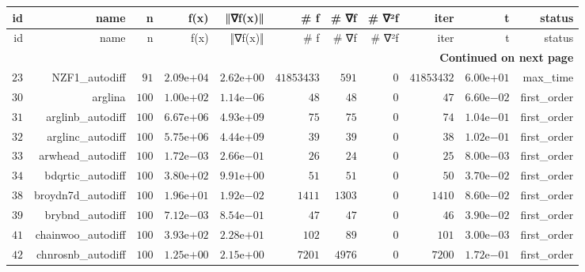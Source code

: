 \documentclass[varwidth=20cm,crop=true]{standalone}
\begin{document}
\begin{longtable}{rrrrrrrrrrr}
  \hline
  id & name & n & f(x) & ‖∇f(x)‖ & # f & # ∇f & # ∇²f & iter & t & status \\\hline
  \endfirsthead
  \hline
  id & name & n & f(x) & ‖∇f(x)‖ & # f & # ∇f & # ∇²f & iter & t & status \\\hline
  \endhead
  \hline
  \multicolumn{11}{r}{{\bfseries Continued on next page}}\\
  \hline
  \endfoot
  \endlastfoot
  \(    23\) & NZF1\_autodiff & \(    91\) & \( 2.09\)e\(+04\) & \( 2.62\)e\(+00\) & \(41853433\) & \(   591\) & \(     0\) & \(41853432\) & \( 6.00\)e\(+01\) & max\_time \\
  \(    30\) & arglina & \(   100\) & \( 1.00\)e\(+02\) & \( 1.14\)e\(-06\) & \(    48\) & \(    48\) & \(     0\) & \(    47\) & \( 6.60\)e\(-02\) & first\_order \\
  \(    31\) & arglinb\_autodiff & \(   100\) & \( 6.67\)e\(+06\) & \( 4.93\)e\(+09\) & \(    75\) & \(    75\) & \(     0\) & \(    74\) & \( 1.04\)e\(-01\) & first\_order \\
  \(    32\) & arglinc\_autodiff & \(   100\) & \( 5.75\)e\(+06\) & \( 4.44\)e\(+09\) & \(    39\) & \(    39\) & \(     0\) & \(    38\) & \( 1.02\)e\(-01\) & first\_order \\
  \(    33\) & arwhead\_autodiff & \(   100\) & \( 1.72\)e\(-03\) & \( 2.66\)e\(-01\) & \(    26\) & \(    24\) & \(     0\) & \(    25\) & \( 8.00\)e\(-03\) & first\_order \\
  \(    34\) & bdqrtic\_autodiff & \(   100\) & \( 3.80\)e\(+02\) & \( 9.91\)e\(+00\) & \(    51\) & \(    51\) & \(     0\) & \(    50\) & \( 3.70\)e\(-02\) & first\_order \\
  \(    38\) & broydn7d\_autodiff & \(   100\) & \( 1.96\)e\(+01\) & \( 1.92\)e\(-02\) & \(  1411\) & \(  1303\) & \(     0\) & \(  1410\) & \( 8.60\)e\(-02\) & first\_order \\
  \(    39\) & brybnd\_autodiff & \(   100\) & \( 7.12\)e\(-03\) & \( 8.54\)e\(-01\) & \(    47\) & \(    47\) & \(     0\) & \(    46\) & \( 3.90\)e\(-02\) & first\_order \\
  \(    41\) & chainwoo\_autodiff & \(   100\) & \( 3.93\)e\(+02\) & \( 2.28\)e\(+01\) & \(   102\) & \(    89\) & \(     0\) & \(   101\) & \( 3.00\)e\(-03\) & first\_order \\
  \(    42\) & chnrosnb\_autodiff & \(   100\) & \( 1.25\)e\(+00\) & \( 2.15\)e\(+00\) & \(  7201\) & \(  4976\) & \(     0\) & \(  7200\) & \( 1.72\)e\(-01\) & first\_order \\

\end{longtable}
\end{document}
